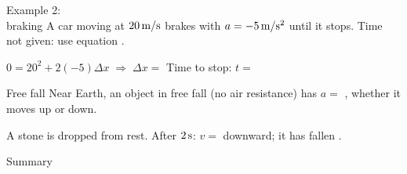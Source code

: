\begin{nrow}{Example 2:\\ braking}
A car moving at $20\ms$ brakes with $a=-5\,\mathrm{m/s^2}$ until it stops. Time not given: use equation .\par
$0=20^2+2(-5)\Delta x\;\Rightarrow\;\Delta x=$ \fillin{$40\m$}\qquad Time to stop: $t=$ 
\end{nrow}
\begin{nrow}{Free fall}
Near Earth, an object in free fall (no air resistance) has $a=$  , whether it moves up or down.\par
A stone is dropped from rest. After $2\,\mathrm{s}$: $v=$ \fillin{$20\ms$} downward; it has fallen .
\end{nrow}
\begin{nrow}{Summary}
\else\vspace{2.4cm}\fi
\end{nrow}

